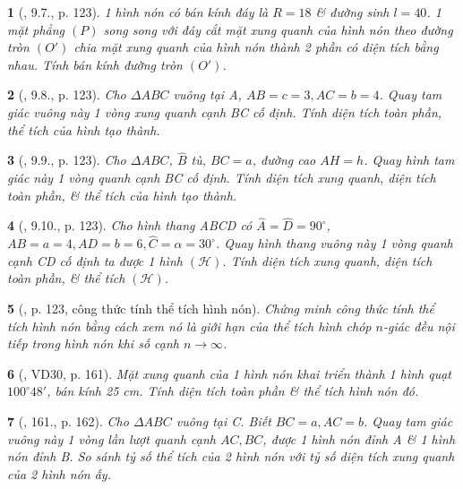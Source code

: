 \documentclass{article}
\newtheorem{baitoan}{}
\begin{document}
\begin{baitoan}[\cite{Binh_boi_duong_Toan_9_tap_2}, 9.7., p. 123]
	1 hình nón có bán kính đáy là $R = 18$ \& đường sinh $l = 40$. 1 mặt phẳng $(P)$ song song với đáy cắt mặt xung quanh của hình nón theo đường tròn $(O')$ chia mặt xung quanh của hình nón thành 2 phần có diện tích bằng nhau. Tính bán kính đường tròn $(O')$.
\end{baitoan}

\begin{baitoan}[\cite{Binh_boi_duong_Toan_9_tap_2}, 9.8., p. 123]
	Cho $\Delta ABC$ vuông tại A, $AB = c = 3,AC = b = 4$. Quay tam giác vuông này 1 vòng xung quanh cạnh BC cố định. Tính diện tích toàn phần, thể tích của hình tạo thành.
\end{baitoan}

\begin{baitoan}[\cite{Binh_boi_duong_Toan_9_tap_2}, 9.9., p. 123]
	Cho $\Delta ABC$, $\widehat{B}$ tù, $BC = a$, đường cao $AH = h$. Quay hình tam giác này 1 vòng quanh cạnh BC cố định. Tính diện tích xung quanh, diện tích toàn phần, \& thể tích của hình tạo thành.
\end{baitoan}

\begin{baitoan}[\cite{Binh_boi_duong_Toan_9_tap_2}, 9.10., p. 123]
	Cho hình thang ABCD có $\widehat{A} = \widehat{D} = 90^\circ$, $AB = a = 4,AD = b = 6,\widehat{C} = \alpha = 30^\circ$. Quay hình thang vuông này 1 vòng quanh cạnh CD cố định ta được 1 hình $(\mathcal{H})$. Tính diện tích xung quanh, diện tích toàn phần, \& thể tích $(\mathcal{H})$.
\end{baitoan}

\begin{baitoan}[\cite{Binh_boi_duong_Toan_9_tap_2}, p. 123, công thức tính thể tích hình nón]
	Chứng minh công thức tính thể tích hình nón bằng cách xem nó là giới hạn của thể tích hình chóp $n$-giác đều nội tiếp trong hình nón khi số cạnh $n\to\infty$.
\end{baitoan}

\begin{baitoan}[\cite{Tuyen_Toan_9_old}, VD30, p. 161]
	Mặt xung quanh của 1 hình nón khai triển thành 1 hình quạt $100^\circ48'$, bán kính {\rm25 cm}. Tính diện tích toàn phần \& thể tích hình nón đó.
\end{baitoan}

\begin{baitoan}[\cite{Tuyen_Toan_9_old}, 161., p. 162]
	Cho $\Delta ABC$ vuông tại C. Biết $BC = a,AC = b$. Quay tam giác vuông này 1 vòng lần lượt quanh cạnh $AC,BC$, được 1 hình nón đỉnh A \& 1 hình nón đỉnh B. So sánh tỷ số thể tích của 2 hình nón với tỷ số diện tích xung quanh của 2 hình nón ấy.
\end{baitoan}
\end{document}

